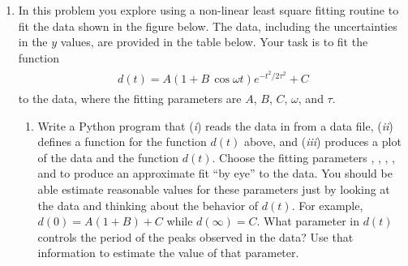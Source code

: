 \documentclass[letterpaper,10pt,english]{sphinxmanual}
\begin{document}
\begin{enumerate}
\begin{enumerate}
\end{enumerate}

\item {} 
In this problem you explore using a non-linear least square fitting routine to fit the data shown in the figure below.   The data, including the uncertainties in the \(y\) values, are provided in the table below.  Your task is to fit the function
\label{chap8/chap8_fitting:equation-eq:OscDecay}\begin{gather}
\begin{split}d(t) = A (1+B\,\cos\omega t) e^{-t^2/2\tau^2} + C\end{split}\label{chap8/chap8_fitting-eq:OscDecay}
\end{gather}
to the data, where the fitting parameters are \(A\), \(B\), \(C\), \(\omega\), and \(\tau\).
\begin{figure}[htbp]
\centering

\label{chap8/chap8_fitting:fig-oscdata}\end{figure}
\begin{enumerate}
\item {} 
Write a Python program that (\emph{i}) reads the data in from a data file, (\emph{ii}) defines a function  for the function \(d(t)\) above, and (\emph{iii}) produces a plot of the data and the function \(d(t)\).  Choose the fitting parameters  , , , , and  to produce an approximate fit ``by eye'' to the data.  You should be able estimate reasonable values for these parameters just by looking at the data and thinking about the behavior of \(d(t)\).  For example, \(d(0)=A(1+B)+C\) while \(d(\infty)=C\).  What parameter in \(d(t)\) controls the period of the peaks observed in the data?  Use that information to estimate the value of that parameter.


\end{enumerate}
\end{enumerate}
\end{document}
